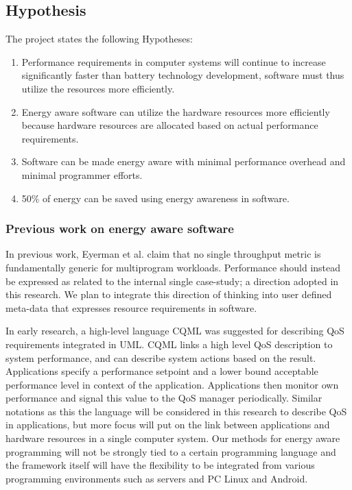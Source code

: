 \documentclass{article}
\begin{document}
\subsection{Hypothesis}
The project states the following Hypotheses:

\begin{enumerate}
 \item Performance requirements in computer systems will continue to increase significantly faster than battery technology development, software must thus utilize the resources more efficiently.
 \item Energy aware software can utilize the hardware resources more efficiently because hardware resources are allocated based on actual performance requirements.
 \item Software can be made energy aware with minimal performance overhead and minimal programmer efforts.
 \item 50\% of energy can be saved using energy awareness in software.
\end{enumerate}



\subsubsection{Previous work on energy aware software}
In previous work, Eyerman et al. \cite{Eyerman:09} claim that no single throughput metric is fundamentally generic for multiprogram workloads. 
Performance should instead be expressed as related to the internal single case-study; a direction adopted in this research. 
We plan to integrate this direction of thinking into user defined meta-data that expresses resource requirements in software.

In early research, a high-level language CQML \cite{Aagedal:01} was suggested for describing QoS requirements integrated in UML. 
CQML links a high level QoS description to system performance, and can describe system actions based on the result. 
Applications specify a performance setpoint and a lower bound acceptable performance level in context of the application. 
Applications then monitor own performance and signal this value to the QoS manager periodically. 
Similar notations as this the language will be considered in this research to describe QoS in applications, 
but more focus will put on the link between applications and hardware resources in a single computer system.
Our methods for energy aware programming will not be strongly tied to a certain programming language and the framework itself will have the flexibility to be integrated from various programming environments such as servers and PC Linux and Android.
\end{document}
